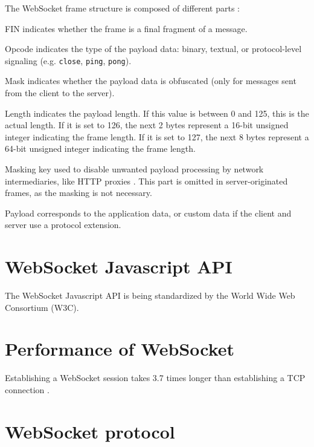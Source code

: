\documentclass[journal,compsoc]{IEEEtran}
\newcommand{\ttt}[1]{\texttt{#1}}
\newcommand{\ws}{WebSocket}
\begin{document}
The \ws{} frame structure is composed of different parts \cite{HighPerfBrowserNetworking:websocket} \cite{performanceEvaluationOfWebsocketProtocol} :
\begin{LaTeXdescription}    %
    \item[FIN] indicates whether the frame is a final fragment of a message.
    \item[Opcode] indicates the type of the payload data: binary, textual, or protocol-level signaling (e.g. \ttt{close}, \ttt{ping}, \ttt{pong}).
    \item[Mask] indicates whether the payload data is obfuscated (only for messages sent from the client to the server).
    \item[Length] indicates the payload length. If this value is between 0 and 125, this is the actual length.
                    If it is set to 126, the next 2 bytes represent a 16-bit unsigned integer indicating the frame length.
                    If it is set to 127, the next 8 bytes represent a 64-bit unsigned integer indicating the frame length.
    \item[Masking key] used to disable unwanted payload processing by network intermediaries, like HTTP proxies \cite{performanceEvaluationOfWebsocketProtocol}.
                    This part is omitted in server-originated frames, as the masking is not necessary.
    \item[Payload] corresponds to the application data, or custom data if the client and server use a protocol extension.
\end{LaTeXdescription}



\section{\ws{} Javascript API}
The \ws{} Javascript API is being standardized by the World Wide Web Consortium (W3C).


\section{Performance of WebSocket}

Establishing a \ws{} session takes 3.7 times longer than establishing a TCP connection \cite{performanceEvaluationOfWebsocketProtocol}.


\section{\ws{} protocol}
\end{document}

